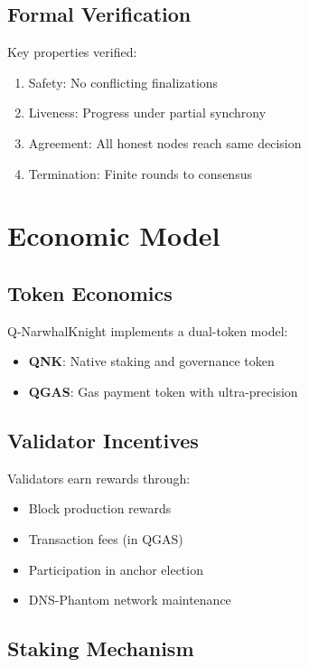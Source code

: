 \documentclass[11pt,a4paper]{article}
\begin{document}
\subsection{Formal Verification}

Key properties verified:
\begin{enumerate}
    \item Safety: No conflicting finalizations
    \item Liveness: Progress under partial synchrony
    \item Agreement: All honest nodes reach same decision
    \item Termination: Finite rounds to consensus
\end{enumerate}

\section{Economic Model}

\subsection{Token Economics}

Q-NarwhalKnight implements a dual-token model:
\begin{itemize}
    \item \textbf{QNK}: Native staking and governance token
    \item \textbf{QGAS}: Gas payment token with ultra-precision
\end{itemize}

\subsection{Validator Incentives}

Validators earn rewards through:
\begin{itemize}
    \item Block production rewards
    \item Transaction fees (in QGAS)
    \item Participation in anchor election
    \item DNS-Phantom network maintenance
\end{itemize}

\subsection{Staking Mechanism}
\end{document}
